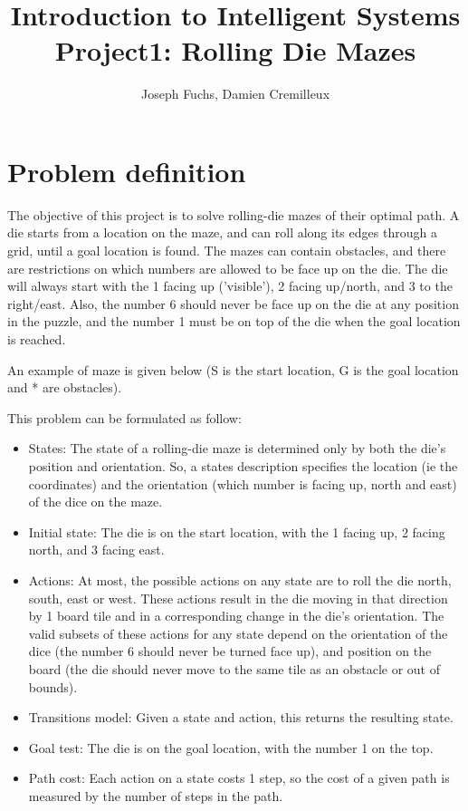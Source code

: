 \documentclass[]{article}
\title{Introduction to Intelligent Systems \\ Project1: Rolling Die Mazes}
\author{Joseph Fuchs, Damien Cremilleux}
\begin{document}
\maketitle

\section{Problem definition}
The objective of this project is to solve rolling-die mazes of their optimal path.
A die starts from a location on the maze, and can roll along its edges through a grid, until a goal location is found.
The mazes can contain obstacles, and there are restrictions on which numbers are allowed to be face up on the die.
The die will always start with the 1 facing up ('visible'), 2 facing up/north, and 3 to the right/east.
Also, the number 6 should never be face up on the die at any position in the puzzle, and the number 1 must be on top of the die when the goal location is reached.

\medskip

An example of maze is given below (S is the start location, G is the goal location and * are obstacles).



\medskip

This problem can be formulated as follow:
\begin{itemize}
\item States: The state of a rolling-die maze is determined only by both the die's position and orientation.
So, a states description specifies the location (ie the coordinates) and the orientation (which number is facing up, north and east) of the dice on the maze.
\item Initial state: The die is on the start location, with the 1 facing up, 2 facing north, and 3 facing east.
\item Actions:  At most, the possible actions on any state are to roll the die north, south, east or west.  These actions result in the die moving in that direction by 1 board tile and in a corresponding change in the die's orientation. The valid subsets of these actions for any state depend on the orientation of the dice (the number 6 should never be turned face up), and position on the board (the die should never move to the same tile as an obstacle or out of bounds).
\item Transitions model: Given a state and action, this returns the resulting state.
\item Goal test: The die is on the goal location, with the number 1 on the top.
\item Path cost: Each action on a state costs 1 step, so the cost of a given path is measured by the number of steps in the path.
\end{itemize}
\end{document}
